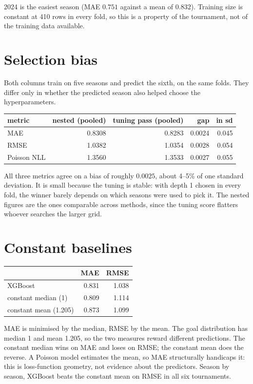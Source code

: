 \documentclass[11pt,a4paper]{article}
\begin{document}
2024 is the easiest season (MAE $0.751$ against a mean of $0.832$).
Training size is constant at 410 rows in every fold, so this is a
property of the tournament, not of the training data available.


\section{Selection bias}

Both columns train on five seasons and predict the sixth, on the same
folds. They differ only in whether the predicted season also helped
choose the hyperparameters.

\begin{center}
\begin{tabular}{lrrrr}
  \toprule
  metric & nested (pooled) & tuning pass (pooled) & gap & in sd \\
  \midrule
  MAE         & 0.8308 & 0.8283 & 0.0024 & 0.045 \\
  RMSE        & 1.0382 & 1.0354 & 0.0028 & 0.054 \\
  Poisson NLL & 1.3560 & 1.3533 & 0.0027 & 0.055 \\
  \bottomrule
\end{tabular}
\end{center}

All three metrics agree on a bias of roughly $0.0025$, about 4--5\% of
one standard deviation. It is small because the tuning is stable: with
depth 1 chosen in every fold, the winner barely depends on which seasons
were used to pick it. The nested figures are the ones comparable across
methods, since the tuning score flatters whoever searches the larger grid.


\section{Constant baselines}

\begin{center}
\begin{tabular}{lrr}
  \toprule
   & MAE & RMSE \\
  \midrule
  XGBoost              & 0.831 & 1.038 \\
  constant median (1)  & 0.809 & 1.114 \\
  constant mean (1.205)& 0.873 & 1.099 \\
  \bottomrule
\end{tabular}
\end{center}

MAE is minimised by the median, RMSE by the mean. The goal distribution
has median 1 and mean 1.205, so the two measures reward different
predictions. The constant median wins on MAE and loses on RMSE; the
constant mean does the reverse. A Poisson model estimates the mean, so
MAE structurally handicaps it: this is loss-function geometry, not
evidence about the predictors. Season by season, XGBoost beats the
constant mean on RMSE in all six tournaments.
\end{document}
